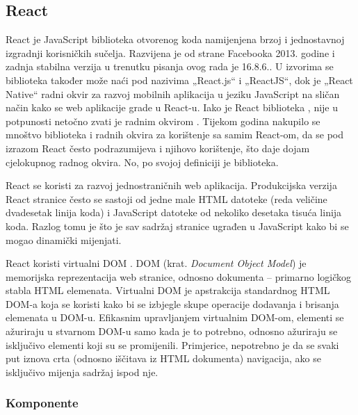 \documentclass[times, utf8, diplomski, numeric]{fer}
\newcommand{\razmakp}{\vspace{18pt}}
\begin{document}
\subsection{React}

React je JavaScript biblioteka otvorenog koda namijenjena brzoj i jednostavnoj izgradnji korisničkih sučelja.
Razvijena je od strane Facebooka 2013. godine i zadnja stabilna verzija u trenutku pisanja ovog rada je 16.8.6.\citep{gh_react_changelog}.
U izvorima se biblioteka također može naći pod nazivima „React.js“ i „ReactJS“, dok je „React Native“ radni okvir za razvoj mobilnih aplikacija u jeziku JavaScript na sličan način kako se web aplikacije grade u React-u\citep{wiki_react}.
Iako je React biblioteka , nije u potpunosti netočno zvati je radnim okvirom .
Tijekom godina nakupilo se mnoštvo biblioteka i radnih okvira za korištenje sa samim React-om, da se pod izrazom React često podrazumijeva i njihovo korištenje, što daje dojam cjelokupnog radnog okvira. No, po svojoj definiciji je biblioteka.

React se koristi za razvoj jednostraničnih  web aplikacija.
Produkcijska verzija React stranice često se sastoji od jedne male HTML datoteke (reda veličine dvadesetak linija koda) i JavaScript datoteke od nekoliko desetaka tisuća linija koda.
Razlog tomu je što je sav sadržaj stranice ugrađen u JavaScript kako bi se mogao dinamički mijenjati.

\razmakp

React koristi virtualni DOM .
DOM (krat. \emph{Document Object Model}) je memorijska reprezentacija web stranice, odnosno dokumenta – primarno logičkog stabla HTML elemenata\citep{mdn_dom}.
Virtualni DOM je apstrakcija standardnog HTML DOM-a koja se koristi kako bi se izbjegle skupe operacije dodavanja i brisanja elemenata u DOM-u.
Efikasnim upravljanjem virtualnim DOM-om, elementi se ažuriraju u stvarnom DOM-u samo kada je to potrebno, odnosno ažuriraju se isključivo elementi koji su se promijenili\citep{med_vdom}.
Primjerice, nepotrebno je da se svaki put iznova crta (odnosno iščitava iz HTML dokumenta) navigacija, ako se isključivo mijenja sadržaj ispod nje.

\razmakp
\subsubsection{Komponente}
\end{document}
